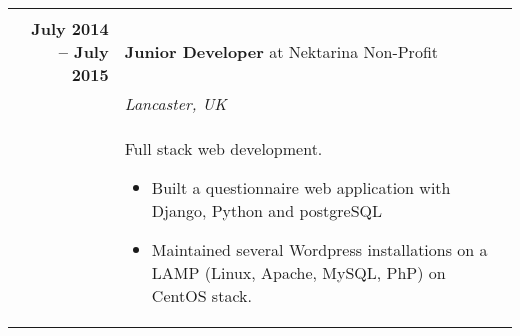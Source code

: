\documentclass[a4paper,10pt]{article} %
\begin{document}
\begin{tabularx}{\textwidth}{r|X}
\multicolumn{2}{r}{} \\ %

\textbf{July 2014 -- July 2015}     & \textbf{Junior Developer} at {Nektarina Non-Profit}\\
                                    & \emph{Lancaster, UK}\\
                                    & \footnotesize
    {Full stack web development.
    \begin{itemize}
    \item Built a questionnaire web application with Django, Python and postgreSQL
    \item Maintained several Wordpress installations on a LAMP (Linux, Apache,
    MySQL, PhP) on CentOS stack.
    \end{itemize}}\\

\end{tabularx}

\end{document}
